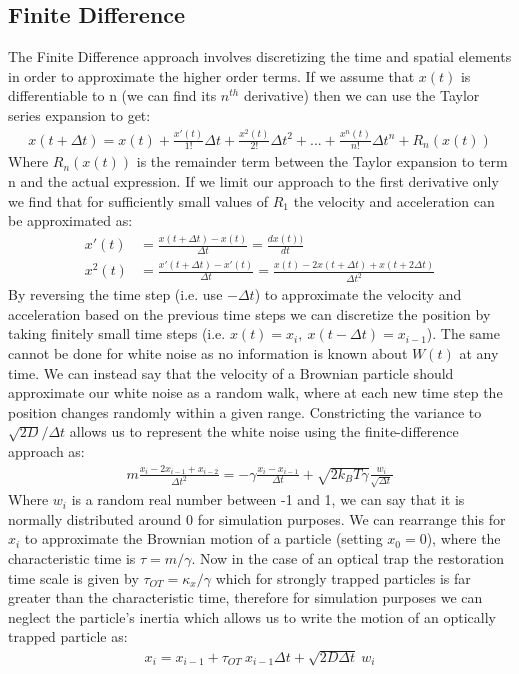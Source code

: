 \documentclass[a4paper,oneside,11pt]{book}
\begin{document}
\subsection{Finite Difference}
The Finite Difference approach involves discretizing the time and spatial elements in order to approximate the higher order terms. If we assume that $x(t)$ is differentiable to n (we can find its $n^{th}$ derivative) then we can use the Taylor series expansion to get:
\begin{align}
	x(t+\Delta t) = x(t)+\frac{x'(t)}{1!}\Delta t + \frac{x^2(t)}{2!}\Delta t^2+...+\frac{x^n(t)}{n!}\Delta t^n+R_n(x(t))	
\end{align}
Where $R_n(x(t))$ is the remainder term between the Taylor expansion to term n and the actual expression. If we limit our approach to the first derivative only we find that for sufficiently small values of $R_1$ the velocity and acceleration can be approximated as:
\begin{align}
	x'(t) &= \frac{x(t+\Delta t)-x(t)}{\Delta t}=\frac{dx(t))}{dt} \\
	x^2(t) &= \frac{x'(t+\Delta t)-x'(t)}{\Delta t} = \frac{x(t)-2x(t+\Delta t)+x(t+2\Delta t)}{\Delta t^2}
\end{align}
By reversing the time step (i.e. use $-\Delta t$) to approximate the velocity and acceleration based on the previous time steps we can discretize the position by taking finitely small  time steps (i.e. $x(t) = x_i,\ x(t-\Delta t) = x_{i-1}$). The same cannot be done for white noise as no information is known about $W(t)$ at any time. We can instead say that the velocity of a Brownian particle should approximate our white noise as a random walk, where at each new time step the position changes randomly within a given range. Constricting the variance to $\sqrt{2D}/\Delta t$ allows us to represent the white noise using the finite-difference approach as:
\begin{align}
	m\frac{x_i-2x_{i-1}+x_{i-2}}{\Delta t^2} = -\gamma\frac{x_i-x_{i-1}}{\Delta t}+\sqrt{2k_BT\gamma}\frac{w_i}{\sqrt{\Delta t}}
\end{align}
Where $w_i$ is a random real number between -1 and 1, we can say that it is normally distributed around 0 for simulation purposes. We can rearrange this for $x_i$ to approximate the Brownian motion of a particle (setting $x_0=0$), where the characteristic time is $\tau = m/\gamma$. Now in the case of an optical trap the restoration time scale is given by $\tau_{OT}=\kappa_x/\gamma$ which for strongly trapped particles is far greater than the characteristic time, therefore for simulation purposes we can neglect the particle's inertia which allows us to write the motion of an optically trapped particle as:
\begin{align}
	\label{eq:sim_langevin}
	x_i = x_{i-1} + \tau_{OT}\ x_{i-1}\Delta t + \sqrt{2D\Delta t}\ w_i
\end{align} 
\end{document}
